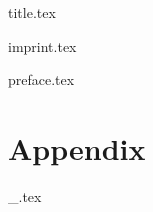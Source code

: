 \documentclass[a4paper,10pt,twocolumn,openany]{book}
\begin{document}
  \frontmatter
  {title.tex}

  \ifauthornotes
    {imprint.tex}
  \fi

  {preface.tex}
  
  \twocolumn
  \mainmatter


  \setcounter{chapter}{0}

  \backmatter
  \part{Appendix}


  \printunsrtglossary[type=items,style=dnd_items]


  \ifauthornotes
    {_.tex}
  \fi
\end{document}
